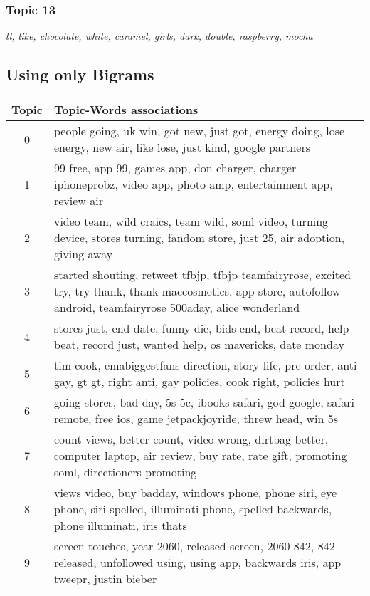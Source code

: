 \subsubsection{Topic 13}
\label{sec:topic_13}
\textit{ll, like, chocolate, white, caramel, girls, dark, double, raspberry, mocha}

\subsection{Using only Bigrams}
\label{sec:using_bigrams}
\begin{table}
  \begin{tabular}{c p{16cm}} \toprule
    Topic & Topic-Words associations \\ \midrule
    0     & people going, uk win, got new, just got, energy doing, lose energy, new air, like lose, just kind, google partners \\ \midrule
    1     & 99 free, app 99, games app, don charger, charger iphoneprobz, video app, photo amp, entertainment app, review air \\ \midrule
    2     & video team, wild craics, team wild, soml video, turning device, stores turning, fandom store, just 25, air adoption, giving away \\ \midrule
    3     & started shouting, retweet tfbjp, tfbjp teamfairyrose, excited try, try thank, thank maccosmetics, app store, autofollow android, teamfairyrose 500aday, alice wonderland \\ \midrule
    4     & stores just, end date, funny die, bids end, beat record, help beat, record just, wanted help, os mavericks, date monday \\ \midrule
    5     & tim cook, emabiggestfans direction, story life, pre order, anti gay, gt gt, right anti, gay policies, cook right, policies hurt \\ \midrule
    6     & going stores, bad day, 5s 5c, ibooks safari, god google, safari remote, free ios, game jetpackjoyride, threw head, win 5s \\ \midrule
    7     & count views, better count, video wrong, dlrtbag better, computer laptop, air review, buy rate, rate gift, promoting soml, directioners promoting \\ \midrule
    8     & views video, buy badday, windows phone, phone siri, eye phone, siri spelled, illuminati phone, spelled backwards, phone illuminati, iris thats \\ \midrule
    9     & screen touches, year 2060, released screen, 2060 842, 842 released, unfollowed using, using app, backwards iris, app tweepr, justin bieber \\ \midrule

\end{tabular}
\end{table}
